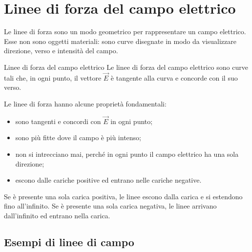 \documentclass[a4paper]{article}
\begin{document}
\section{Linee di forza del campo elettrico}

Le linee di forza sono un modo geometrico per rappresentare un campo elettrico. Esse non sono oggetti materiali: sono curve disegnate in modo da visualizzare direzione, verso e intensità del campo.

\begin{snippetdefinition}{Linee di forza del campo elettrico}
    Le linee di forza del campo elettrico sono curve tali che, in ogni punto, il vettore \(\vec{E}\) è tangente alla curva e concorde con il suo verso.
\end{snippetdefinition}

Le linee di forza hanno alcune proprietà fondamentali:
\begin{itemize}
    \item sono tangenti e concordi con \(\vec{E}\) in ogni punto;
    \item sono più fitte dove il campo è più intenso;
    \item non si intrecciano mai, perché in ogni punto il campo elettrico ha una sola direzione;
    \item escono dalle cariche positive ed entrano nelle cariche negative.
\end{itemize}

Se è presente una sola carica positiva, le linee escono dalla carica e si estendono fino all'infinito. Se è presente una sola carica negativa, le linee arrivano dall'infinito ed entrano nella carica.

\begin{center}
\end{center}

\subsection{Esempi di linee di campo}
\end{document}
